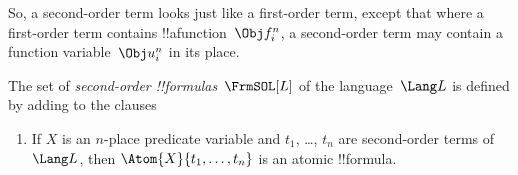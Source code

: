 \documentclass[../../../include/open-logic-section]{subfiles}
\begin{document}
\begin{explain}
So, a second-order term looks just like a first-order term, except
that where a first-order term contains !!a{function}~$\Obj f^n_i$, a
second-order term may contain a function variable~$\Obj u^n_i$ in its
place.
\end{explain}

\begin{defn}
The set of \emph{second-order !!{formula}s}~$\FrmSOL[L]$ of the
language~$\Lang L$ is defined by adding to
 the clauses
\begin{enumerate}
\item If $X$ is an $n$-place predicate variable and $t_1$, \dots,
  $t_n$ are second-order terms of~$\Lang L$, then
  $\Atom{X}{t_1,\ldots, t_n}$ is an atomic !!{formula}.




\end{enumerate}
\end{defn}
\end{document}
